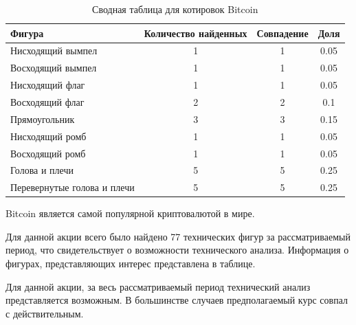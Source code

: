 \documentclass[bachelor, och, coursework]{SCWorks}
\begin{document}
        \begin{table}[!hbt]
            \caption{Сводная таблица для котировок Bitcoin}
            \centering
            \begin{tabular}{|l|c|c|c|}
            \hline
            Фигура                      & \multicolumn{1}{l|}{Количество найденных} & Совпадение & Доля \\ \hline
            Нисходящий вымпел           & 1                                         & 1          & 0.05 \\ \hline
            Восходящий вымпел           & 1                                         & 1          & 0.05 \\ \hline
            Нисходящий флаг             & 1                                         & 1          & 0.05 \\ \hline
            Восходящий флаг             & 2                                         & 2          & 0.1  \\ \hline
            Прямоугольник               & 3                                         & 3          & 0.15 \\ \hline
            Нисходящий ромб             & 1                                         & 1          & 0.05 \\ \hline
            Восходящий ромб             & 1                                         & 1          & 0.05 \\ \hline
            Голова и плечи              & 5                                         & 5          & 0.25 \\ \hline
            Перевернутые голова и плечи & 5                                         & 5          & 0.25 \\ \hline
            \end{tabular}
           
                 
        \end{table}
        
        Bitcoin является самой популярной криптовалютой в мире.

        Для данной акции всего было найдено 77 технических фигур за 
        рассматриваемый период, что свидетельствует о возможности технического 
        анализа. Информация о фигурах, представляющих интерес представлена в 
        таблице.
        
        Для данной акции, за весь рассматриваемый период технический анализ 
        представляется возможным. В большинстве случаев предполагаемый курс 
        совпал с действительным.
        
\end{document}
